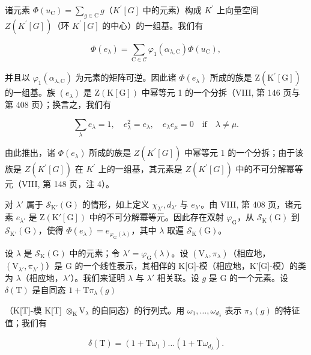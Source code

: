 诸元素 \(\Phi(u_{\mathrm{C}}) = \sum_{g\in \mathrm{C}}g\)（\(K^{\prime}[G]\) 中的元素）构成 \(K^{\prime}\) 上向量空间 \(Z(K^{\prime}[G])\)（环 \(K^{\prime}[G]\) 的中心）的一组基。我们有

\[
\Phi (e _ {\lambda}) = \sum_ {\mathrm{C} \in \mathcal {C}} \varphi_ {1} (\alpha_ {\lambda , \mathrm{C}}) \Phi (u _ {\mathrm{C}}),\tag{46}
\]

并且以 \(\varphi_{1}(\alpha_{\lambda,\mathrm{C}})\) 为元素的矩阵可逆。因此诸 \(\Phi(e_{\lambda})\) 所成的族是 \(\mathrm{Z}(\mathrm{K}^{\prime}[\mathrm{G}])\) 的一组基。族 \((e_{\lambda})\) 是 \(\mathrm{Z}(\mathrm{K}[\mathrm{G}])\) 中幂等元 1 的一个分拆（VIII, 第 146 页与第 408 页）；换言之，我们有

\[
\sum_ {\lambda} e _ {\lambda} = 1, \quad e _ {\lambda} ^ {2} = e _ {\lambda}, \quad e _ {\lambda} e _ {\mu} = 0 \quad \mathrm{if} \quad \lambda \neq \mu .
\]

由此推出，诸 \(\Phi(e_{\lambda})\) 所成的族是 \(Z(K^{\prime}[G])\) 中幂等元 1 的一个分拆；由于该族是 \(Z(K^{\prime}[G])\) 在 \(K^{\prime}\) 上的一组基，其元素是 \(Z(K^{\prime}[G])\) 中的不可分解幂等元（VIII, 第 148 页，注 4）。

对 \(\lambda'\) 属于 \(\mathcal{S}_{\mathrm{K}'}(\mathrm{G})\) 的情形，如上定义 \(\chi_{\lambda'}, d_{\lambda'}\) 与 \(e_{\lambda'}\)。由 VIII, 第 408 页，诸元素 \(e_{\lambda'}\) 是 \(\mathrm{Z}(\mathrm{K}'[\mathrm{G}])\) 中的不可分解幂等元。因此存在双射 \(\varphi_{\mathrm{G}}\)，从 \(\mathcal{S}_{\mathrm{K}}(\mathrm{G})\) 到 \(\mathcal{S}_{\mathrm{K}'}(\mathrm{G})\)，使得 \(\Phi(e_{\lambda}) = e_{\varphi_{\mathrm{G}}(\lambda)}\)，其中 \(\lambda\) 取遍 \(\mathcal{S}_{\mathrm{K}}(\mathrm{G})\)。

设 \(\lambda\) 是 \(\mathcal{S}_{\mathrm{K}}(\mathrm{G})\) 中的元素；令 \(\lambda' = \varphi_{\mathrm{G}}(\lambda)\)。设 \((\mathrm{V}_{\lambda}, \pi_{\lambda})\)（相应地，\((\mathrm{V}_{\lambda'}, \pi_{\lambda'})\)）是 G 的一个线性表示，其相伴的 K{[}G{]}-模（相应地，K'{[}G{]}-模）的类为 \(\lambda\)（相应地，\(\lambda'\)）。我们来证明 \(\lambda\) 与 \(\lambda'\) 相关联。设 \(g\) 是 G 的一个元素。设 \(\delta(\mathrm{T})\) 是自同态 \(1 + \mathrm{T}\pi_{\lambda}(g)\)

（K{[}T{]}-模 K{[}T{]} \(\otimes_{\mathrm{K}}\mathrm{V}_{\lambda}\) 的自同态）的行列式。用 \(\omega_{1},\ldots ,\omega_{d_{\lambda}}\) 表示 \(\pi_{\lambda}(g)\) 的特征值；我们有

\[
\delta (\mathrm{T}) = (1 + \mathrm{T} \omega_ {1}) \dots (1 + \mathrm{T} \omega_ {d _ {\lambda}}).
\]


